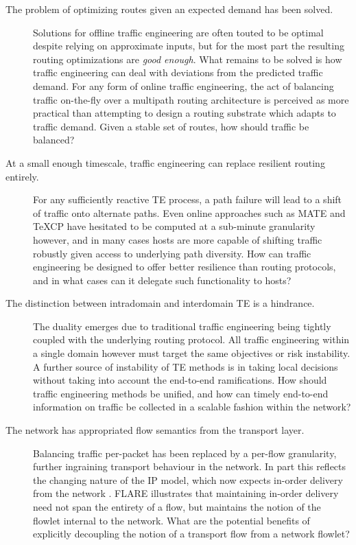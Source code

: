 \renewcommand{\descriptionlabel}[1]{\hspace{\labelsep}\textbf{#1}}
\begin{description}
\item[The problem of optimizing routes given an expected demand has been solved.]{
    Solutions for offline traffic engineering \cite{Fortz:2000p350,YufeiWang:1999p222,Wang:2001p506} are often touted to be optimal despite relying on approximate inputs, but for the most part the resulting routing optimizations are \emph{good enough}. 
    What remains to be solved is how traffic engineering can deal with deviations from the predicted traffic demand.
    For any form of online traffic engineering, the act of balancing traffic on-the-fly over a multipath routing architecture is perceived as more practical than attempting to design a routing substrate which adapts to traffic demand.
    Given a stable set of routes, how should traffic be balanced?
}

\item[At a small enough timescale, traffic engineering can replace resilient routing entirely.]{
    For any sufficiently reactive \ac{TE} process, a path failure will lead to a shift of traffic onto alternate paths. 
    Even online approaches such as \ac{MATE} and \ac{TeXCP} have hesitated to be computed at a sub-minute granularity however, and in many cases hosts are more capable of shifting traffic robustly given access to underlying path diversity.
    How can traffic engineering be designed to offer better resilience than routing protocols, and in what cases can it delegate such functionality to hosts?
}

\item[The distinction between intradomain and interdomain \ac{TE} is a hindrance.]{
    The duality emerges due to traditional traffic engineering being tightly coupled with the underlying routing protocol.
    All traffic engineering within a single domain however must target the same objectives or risk instability.
    A further source of instability of \ac{TE} methods is in taking local decisions without taking into account the end-to-end ramifications.
    How should traffic engineering methods be unified, and how can timely end-to-end information on traffic be collected in a scalable fashion within the network?
}

\item[The network has appropriated flow semantics from the transport layer.]{
    Balancing traffic per-packet has been replaced by a per-flow granularity, further ingraining transport behaviour in the network.
    In part this reflects the changing nature of the \ac{IP} model, which now expects in-order delivery from the network \cite{Thaler:2010p223}.
    \ac{FLARE} \cite{Sinha:2004p124} illustrates that maintaining in-order delivery need not span the entirety of a flow, but maintains the notion of the flowlet internal to the network.
    What are the potential benefits of explicitly decoupling the notion of a transport flow from a network flowlet?
}
\end{description}


